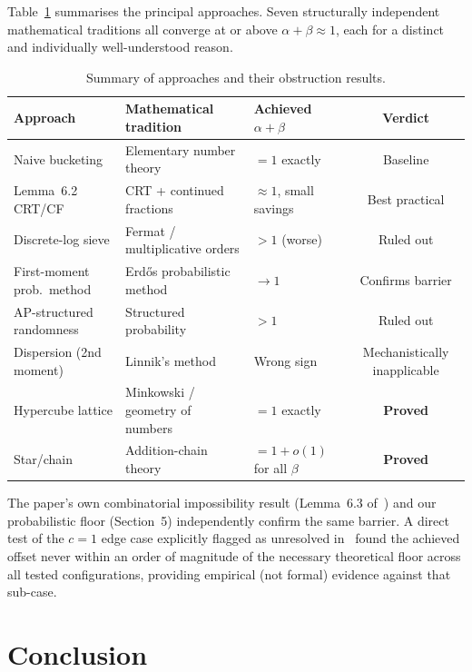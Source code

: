 \documentclass[12pt]{article}
\theoremstyle{remark}
\begin{document}
Table~\ref{tab:summary} summarises the principal approaches.  Seven
structurally independent mathematical traditions all converge at or above
$\alpha + \beta \approx 1$, each for a distinct and individually
well-understood reason.

\begin{table}[ht]
\centering
\small
\begin{tabular}{@{}lllc@{}}
\toprule
Approach & Mathematical tradition & Achieved $\alpha+\beta$ & Verdict \\
\midrule
Naive bucketing          & Elementary number theory      & $= 1$ exactly    & Baseline \\
Lemma~6.2 CRT/CF         & CRT + continued fractions     & $\approx 1$, small savings & Best practical \\
Discrete-log sieve       & Fermat / multiplicative orders & $>1$ (worse)    & Ruled out \\
First-moment prob.\ method & Erd\H{o}s probabilistic method & $\to 1$       & Confirms barrier \\
AP-structured randomness & Structured probability        & $> 1$            & Ruled out \\
Dispersion (2nd moment)  & Linnik's method               & Wrong sign       & Mechanistically inapplicable \\
Hypercube lattice        & Minkowski / geometry of numbers & $=1$ exactly   & \textbf{Proved} \\
Star/chain               & Addition-chain theory         & $=1+o(1)$ for all $\beta$ & \textbf{Proved} \\
\bottomrule
\end{tabular}
\caption{Summary of approaches and their obstruction results.}
\label{tab:summary}
\end{table}

The paper's own combinatorial impossibility result (Lemma~6.3 of~\cite{umans2025})
and our probabilistic floor (Section~5) independently confirm the same barrier.
A direct test of the $c = 1$ edge case explicitly flagged as unresolved
in~\cite{umans2025} found the achieved offset never within an order of magnitude
of the necessary theoretical floor across all tested configurations, providing
empirical (not formal) evidence against that sub-case.

\section{Conclusion}
\end{document}
